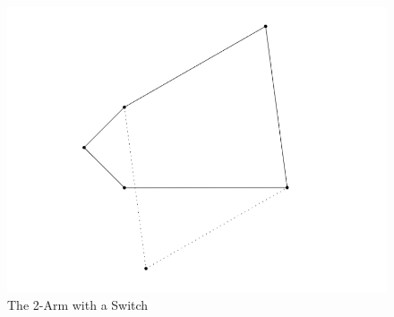 \documentclass{article}
\begin{document}
\begin{figure}[h!]
\centering
\includegraphics[scale=0.5]{./images/2_arm_switch_no_fixed.png}
\caption{The 2-Arm with a Switch}
\label{fig:The 2-Arm Switch}
\end{figure}
\end{document}
